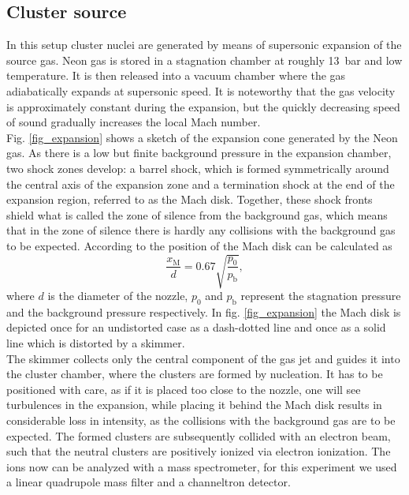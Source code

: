 \documentclass[a4paper,10pt]{article}
\begin{document}
\subsection{Cluster source}
In this setup cluster nuclei are generated by means of supersonic expansion of the source gas. Neon gas is stored in a stagnation chamber at roughly \SI{13}{\bar} and low temperature. It is then released into a vacuum chamber where the gas adiabatically expands at supersonic speed. It is noteworthy that the gas velocity is approximately constant during the expansion, but the quickly decreasing speed of sound gradually increases the local Mach number. \\
Fig. \ref{fig_expansion} shows a sketch of the expansion cone generated by the Neon gas. As there is a low but finite background pressure in the expansion chamber, two shock zones develop: a barrel shock, which is formed symmetrically around the central axis of the expansion zone and a termination shock at the end of the expansion region, referred to as the Mach disk. Together, these shock fronts shield what is called the zone of silence from the background gas, which means that in the zone of silence there is hardly any collisions with the background gas to be expected. According to \cite{script} the position of the Mach disk can be calculated as
\begin{equation}
	\frac{x_\mathrm{M}}{d} = 0.67 \sqrt{\frac{p_0}{p_\mathrm{b}}},
\end{equation}
where $d$ is the diameter of the nozzle, $p_0$ and $p_\mathrm{b}$ represent the stagnation pressure and the background pressure respectively. In fig. \ref{fig_expansion} the Mach disk is depicted once for an undistorted case as a dash-dotted line and once as a solid line which is distorted by a skimmer. \\
The skimmer collects only the central component of the gas jet and guides it into the cluster chamber, where the clusters are formed by nucleation. It has to be positioned with care, as if it is placed too close to the nozzle, one will see turbulences in the expansion, while placing it behind the Mach disk results in considerable loss in intensity, as the collisions with the background gas are to be expected. The formed clusters are subsequently collided with an electron beam, such that the neutral clusters are positively ionized via electron ionization. The ions now can be analyzed with a mass spectrometer, for this experiment we used a linear quadrupole mass filter and a channeltron detector.%
\end{document}
